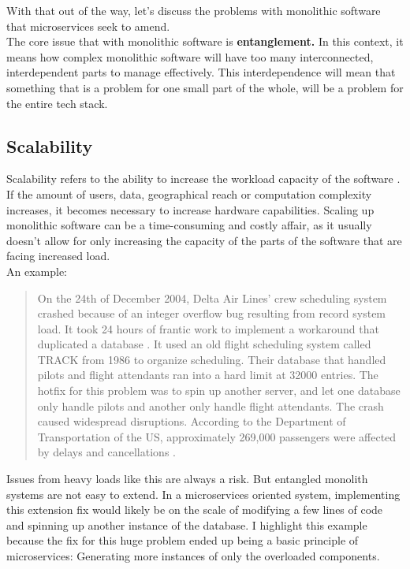 With that out of the way, let's discuss the problems with monolithic software that microservices seek to amend.\\
The core issue that with monolithic software is \textbf{entanglement.}
In this context, it means how complex monolithic software will have too many interconnected, interdependent parts to manage effectively.
This interdependence will mean that something that is a problem for one small part of the whole, will be a problem for the entire tech stack.

\subsection{Scalability}
Scalability refers to the ability to increase the workload capacity of the software \cite*{Scalability}.
If the amount of users, data, geographical reach or computation complexity increases, it becomes necessary to increase hardware capabilities.
Scaling up monolithic software can be a time-consuming and costly affair, as it usually doesn't allow for only increasing the capacity of the parts of the software that are facing increased load.  \\
An example:
\begin{quote}
    On the 24th of December 2004, Delta Air Lines' crew scheduling system crashed because of an integer overflow bug resulting from record system load.
    It took 24 hours of frantic work to implement a workaround that duplicated a database \cite*{USAToday}.
    It used an old flight scheduling system called TRACK from 1986 to organize scheduling.
    Their database that handled pilots and flight attendants ran into a hard limit at 32000 entries.
    The hotfix for this problem was to spin up another server, and let one database only handle pilots and another only handle flight attendants.
    The crash caused widespread disruptions. According to the Department of Transportation of the US, approximately 269,000 passengers were affected by delays and cancellations \cite*{DOT}.
\end{quote}
Issues from heavy loads like this are always a risk. But entangled monolith systems are not easy to extend.
In a microservices oriented system, implementing this extension fix would likely be on the scale of modifying a few lines of code and spinning up another instance of the database.
I highlight this example because the fix for this huge problem ended up being a basic principle of microservices: Generating more instances of only the overloaded components.
\\

